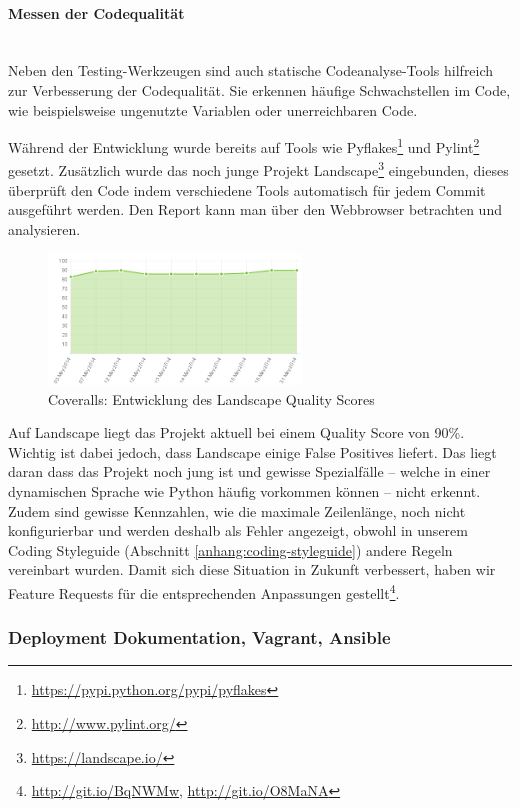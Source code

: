 \paragraph{Messen der Codequalität} \hspace{0pt} \\
Neben den Testing-Werkzeugen sind auch statische Codeanalyse-Tools hilfreich zur
Verbesserung der Codequalität. Sie erkennen häufige Schwachstellen im Code, wie
beispielsweise ungenutzte Variablen oder unerreichbaren Code.

Während der Entwicklung wurde bereits auf Tools wie
Pyflakes\footnote{\url{https://pypi.python.org/pypi/pyflakes}} und
Pylint\footnote{\url{http://www.pylint.org/}} gesetzt. Zusätzlich wurde das noch
junge Projekt Landscape\footnote{\url{https://landscape.io/}} eingebunden,
dieses überprüft den Code indem verschiedene Tools automatisch für jedem Commit
ausgeführt werden. Den Report kann man über den Webbrowser betrachten und
analysieren.

\begin{figure}[H]
	\centering
	\includegraphics[width=0.6\textwidth]{images/landscape}
	\caption{Coveralls: Entwicklung des Landscape Quality Scores}
	\label{improvements:landscape}
\end{figure}

Auf Landscape liegt das Projekt aktuell bei einem Quality Score von 90\%.
Wichtig ist dabei jedoch, dass Landscape einige False Positives liefert. Das
liegt daran dass das Projekt noch jung ist und gewisse Spezialfälle -- welche in
einer dynamischen Sprache wie Python häufig vorkommen können -- nicht erkennt.
Zudem sind gewisse Kennzahlen, wie die maximale Zeilenlänge, noch nicht
konfigurierbar und werden deshalb als Fehler angezeigt, obwohl in unserem Coding
Styleguide (Abschnitt \ref{anhang:coding-styleguide}) andere Regeln vereinbart
wurden. Damit sich diese Situation in Zukunft verbessert, haben wir Feature
Requests für die entsprechenden Anpassungen
gestellt\footnote{\url{http://git.io/BqNWMw}, \url{http://git.io/O8MaNA}}.


\subsubsection{Deployment Dokumentation, Vagrant, Ansible}

